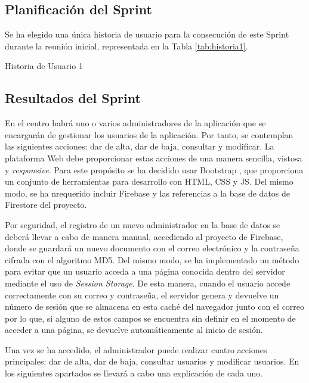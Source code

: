 \subsection{Planificación del Sprint}
Se ha elegido una única historia de usuario para la consecución de este Sprint durante la reunión inicial, representada en la Tabla \ref{tab:historia1}.

\begin{table}[hp]
	\centering
	{\small
		
	}
	\caption[Historia de Usuario 1]
	{Historia de Usuario 1}
	\label{tab:historia1}
\end{table}

\subsection{Resultados del Sprint}
En el centro habrá uno o varios administradores de la aplicación que se encargarán de gestionar los usuarios de la aplicación. Por tanto, se contemplan las siguientes acciones: dar de alta, dar de baja, consultar y modificar. La plataforma Web debe proporcionar estas acciones de una manera sencilla, vistosa y \textit{responsive}. Para este propósito se ha decidido usar Bootstrap \cite{Bootstrap}, que proporciona un conjunto de herramientas para desarrollo con HTML, CSS y JS. Del mismo modo, se ha nrequerido incluir Firebase y las referencias a la base de datos de Firestore del proyecto.

Por seguridad, el registro de un nuevo administrador en la base de datos se deberá llevar a cabo de manera manual, accediendo al proyecto de Firebase, donde se guardará un nuevo documento con el correo electrónico y la contraseña cifrada con el algoritmo MD5. Del mismo modo, se ha implementado un método para evitar que un usuario acceda a una página conocida dentro del servidor mediante el uso de \textit{Session Storage}. De esta manera, cuando el usuario accede correctamente con su correo y contraseña, el servidor genera y devuelve un número de sesión que se almacena en esta caché del navegador junto con el correo por lo que, si alguno de estos campos se encuentra sin definir en el momento de acceder a una página, se devuelve automáticamente al inicio de sesión.

Una vez se ha accedido, el administrador puede realizar cuatro acciones principales: dar de alta, dar de baja, consultar usuarios y modificar usuarios. En los siguientes apartados se llevará a cabo una explicación de cada uno.

